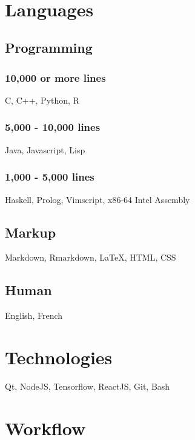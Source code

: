 \documentclass[]{article}
\theoremstyle{plain}
\theoremstyle{remark}
\theoremstyle{definition}
\begin{document}
\begin{figure}
\begin{minipage}[t]{0.65\textwidth}
\end{minipage}
\hfill
\begin{minipage}[t]{0.32\textwidth}
\color{gray}
\ %
\vspace{-1.5em}

\section{Languages}

\subsection{Programming}

\subsubsection{10,000 or more lines}

C, C++, Python, R

\subsubsection{5,000 - 10,000 lines}

Java, Javascript, Lisp

\subsubsection{1,000 - 5,000 lines}

Haskell, Prolog, Vimscript, x86-64 Intel Assembly

\subsection{Markup}

Markdown, Rmarkdown, \LaTeX, HTML, CSS

\subsection{Human}

English, French

\section{Technologies}

Qt, NodeJS, Tensorflow, ReactJS, Git, Bash

\section{Workflow}


\end{minipage}
\end{figure}
\end{document}
